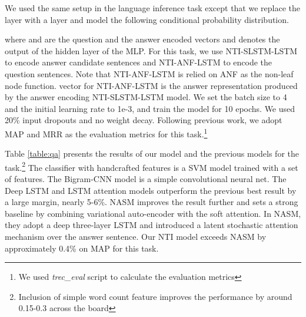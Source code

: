 \documentclass[11pt]{article}
\begin{document}
We used the same setup in the language inference task except that we replace the  layer with a  layer and model the following conditional probability distribution.

where  and  are the question and the answer encoded vectors and  denotes the output of the hidden layer of the MLP. 
For this task, we use NTI-SLSTM-LSTM to encode answer candidate sentences and NTI-ANF-LSTM to encode the question sentences. Note that NTI-ANF-LSTM is relied on ANF as the non-leaf node function.  vector for NTI-ANF-LSTM is the answer representation produced by the answer encoding NTI-SLSTM-LSTM model. We set the batch size to 4 and the initial learning rate to 1e-3, and train the model for 10 epochs. We used 20\% input dropouts and no  weight decay. Following previous work, we adopt MAP and MRR as the evaluation metrics for this task.\footnote{We used \textit{trec\_eval} script to calculate the evaluation metrics}

Table \ref{table:qa} presents the results of our model and the previous models for the task.\footnote{Inclusion of simple word count feature improves the performance by around 0.15-0.3 across the board} The classifier with handcrafted features is a SVM model trained with a set of features. The Bigram-CNN model is a simple convolutional neural net. The Deep LSTM and LSTM attention models outperform the previous best result by a large margin, nearly 5-6\%. NASM improves the result further and sets a strong baseline by combining variational auto-encoder \cite{kingma2014auto} with the soft attention. In NASM, they adopt a deep three-layer LSTM and introduced a latent stochastic attention mechanism over the answer sentence. Our NTI model exceeds NASM by approximately 0.4\% on MAP for this task.
\end{document}
